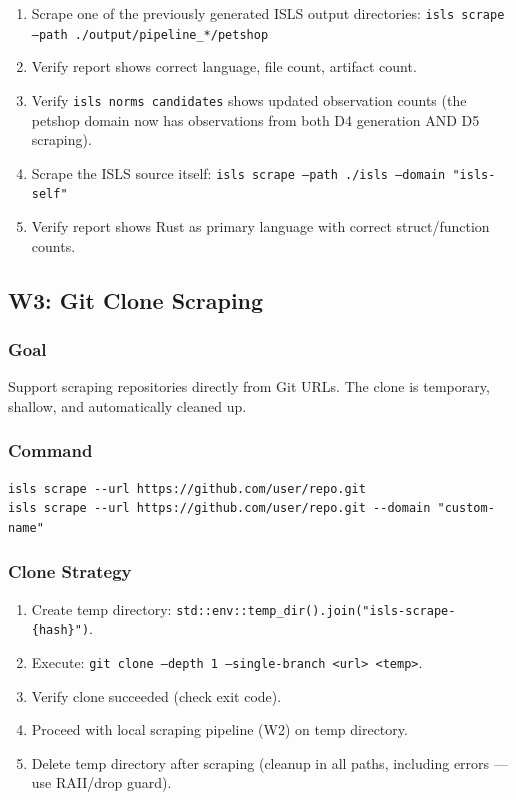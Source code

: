 \documentclass[11pt,a4paper]{article}
\begin{document}
\begin{enumerate}[nosep]
\item Scrape one of the previously generated ISLS output directories:
      \texttt{isls scrape --path ./output/pipeline\_*/petshop}
\item Verify report shows correct language, file count, artifact count.
\item Verify \texttt{isls norms candidates} shows updated observation
      counts (the petshop domain now has observations from both
      D4 generation AND D5 scraping).
\item Scrape the ISLS source itself:
      \texttt{isls scrape --path ./isls --domain "isls-self"}
\item Verify report shows Rust as primary language with correct
      struct/function counts.
\end{enumerate}


\subsection{W3: Git Clone Scraping}
\label{sec:w3}

\subsubsection{Goal}

Support scraping repositories directly from Git URLs. The clone is
temporary, shallow, and automatically cleaned up.

\subsubsection{Command}

\begin{lstlisting}[style=bash]
isls scrape --url https://github.com/user/repo.git
isls scrape --url https://github.com/user/repo.git --domain "custom-name"
\end{lstlisting}

\subsubsection{Clone Strategy}

\begin{enumerate}[nosep]
\item Create temp directory:
      \texttt{std::env::temp\_dir().join("isls-scrape-\{hash\}")}.
\item Execute: \texttt{git clone --depth 1 --single-branch <url> <temp>}.
\item Verify clone succeeded (check exit code).
\item Proceed with local scraping pipeline (W2) on temp directory.
\item Delete temp directory after scraping (cleanup in all paths,
      including errors --- use RAII/drop guard).
\end{enumerate}
\end{document}
